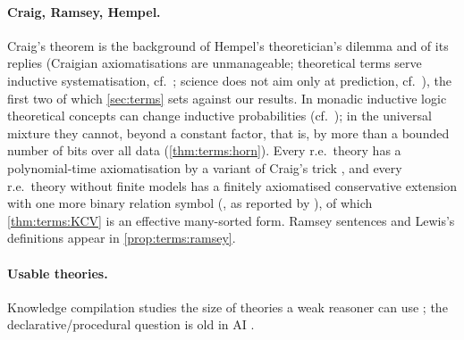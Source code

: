 \paragraph{Craig, Ramsey, Hempel.}
Craig's theorem \citep{craig1953axiomatizability,craig1956replacement} is the background of Hempel's theoretician's dilemma \citep{hempel1958theoretician} and of its replies (Craigian axiomatisations are unmanageable; theoretical terms serve inductive systematisation, cf.\ \citealp{niiniluoto1972inductive}; science does not aim only at prediction, cf.\ \citealp{putnam1965craig}), the first two of which \cref{sec:terms} sets against our results. In monadic inductive logic theoretical concepts can change inductive probabilities (cf.\ \citealp{niiniluoto1973theoretical}); in the universal mixture they cannot, beyond a constant factor, that is, by more than a bounded number of bits over all data (\cref{thm:terms:horn}). Every r.e.\ theory has a polynomial-time axiomatisation by a variant of Craig's trick \citep{krajicek2025proof}, and every r.e.\ theory without finite models has a finitely axiomatised conservative extension with one more binary relation symbol (\citealp{kleene1952finite,craigvaught1958finite}, as reported by \citealp{pakhomov2019question}), of which \cref{thm:terms:KCV} is an effective many-sorted form. Ramsey sentences and Lewis's definitions \citep{ramsey1931theories,lewis1970define} appear in \cref{prop:terms:ramsey}.

\paragraph{Usable theories.}
Knowledge compilation studies the size of theories a weak reasoner can use \citep{selman1996knowledge,darwiche2002knowledge,delval1994tractable,babka2013complexity}; the declarative/procedural question is old in AI \citep{mccarthy1959programs,winograd1975frame,kowalski1979algorithm}.

